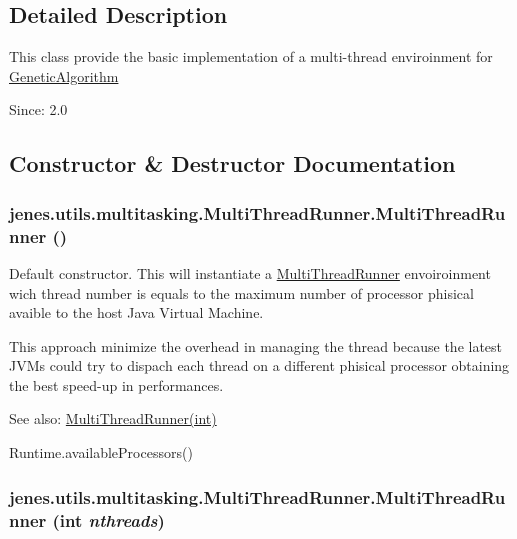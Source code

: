 \subsection{Detailed Description}
This class provide the basic implementation of a multi-thread enviroinment for \hyperlink{}{GeneticAlgorithm}

\begin{Desc}
\item[Since:]2.0 \end{Desc}


\subsection{Constructor \& Destructor Documentation}
\hypertarget{classjenes_1_1utils_1_1multitasking_1_1_multi_thread_runner_b0815486f3159f086cd06ccab94df319}{
\subsubsection[MultiThreadRunner]{\setlength{\rightskip}{0pt plus 5cm}jenes.utils.multitasking.MultiThreadRunner.MultiThreadRunner ()}}
\label{classjenes_1_1utils_1_1multitasking_1_1_multi_thread_runner_b0815486f3159f086cd06ccab94df319}


Default constructor. This will instantiate a \hyperlink{classjenes_1_1utils_1_1multitasking_1_1_multi_thread_runner}{MultiThreadRunner} envoiroinment wich thread number is equals to the maximum number of processor phisical avaible to the host Java Virtual Machine. \par
 This approach minimize the overhead in managing the thread because the latest JVMs could try to dispach each thread on a different phisical processor obtaining the best speed-up in performances. \begin{Desc}
\item[See also:]\hyperlink{classjenes_1_1utils_1_1multitasking_1_1_multi_thread_runner_6319362b08c06d8bf26989407d223c31}{MultiThreadRunner(int)} 

Runtime.availableProcessors() \end{Desc}
\hypertarget{classjenes_1_1utils_1_1multitasking_1_1_multi_thread_runner_6319362b08c06d8bf26989407d223c31}{
\subsubsection[MultiThreadRunner]{\setlength{\rightskip}{0pt plus 5cm}jenes.utils.multitasking.MultiThreadRunner.MultiThreadRunner (int {\em nthreads})}}
\label{classjenes_1_1utils_1_1multitasking_1_1_multi_thread_runner_6319362b08c06d8bf26989407d223c31}


